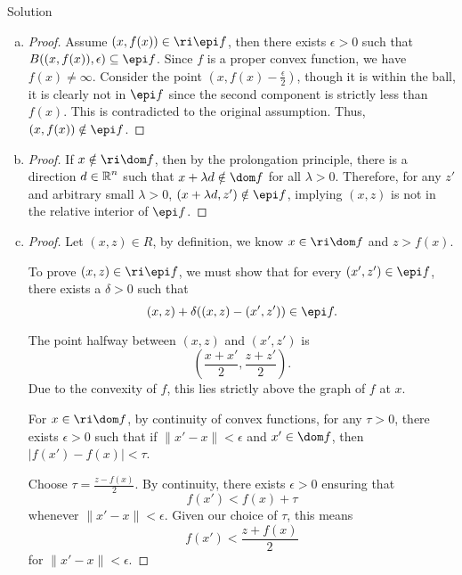 \documentclass{article}
\begin{document}
\begin{solution}
    {Solution}
    \begin{enumerate}[(a)]
        \item {
                \begin{proof}
                    Assume $(x,f(x))\in\ri\epi f$, then there exists $\epsilon>0$ such that $B((x,f(x)),\epsilon)\subseteq\epi f$. Since $f$ is a proper convex function, we have $f(x)\neq\infty$. Consider the point $(x, f(x)-\frac{\epsilon}{2})$, though it is within the ball, it is clearly not in $\epi f$ since the second component is strictly less than $f(x)$. This is contradicted to the original assumption. Thus, $(x,f(x))\notin\epi f$.
                \end{proof}
        }
        \item {
            \begin{proof}
                If $x\notin \ri\dom f$, then by the prolongation principle, there is a direction $d\in\operatorname{\mathbb{R}}^n$ such that $x+\lambda d\notin \dom f$ for all $\lambda>0$. Therefore, for any $z'$ and arbitrary small  $\lambda>0$, $(x+\lambda d, z')\notin \epi f$, implying $(x,z)$ is not in the relative interior of $\epi f$.
            \end{proof}
        }
        \item {
            \begin{proof}
                Let $(x, z) \in R$, by definition, we know $x \in \ri\dom f$ and $z > f(x)$.

                To prove $(x,z) \in \ri\epi f$, we must show that for every $(x', z') \in \epi f$, there exists a $\delta > 0$ such that
                \[(x, z) + \delta((x, z) - (x', z')) \in \epi f.\]

                The point halfway between $(x, z)$ and $(x', z')$ is
                \[ \left( \frac{x + x'}{2}, \frac{z + z'}{2} \right). \]
                Due to the convexity of $f$, this lies strictly above the graph of $f$ at $x$.

                For $x \in \ri\dom f$, by continuity of convex functions, for any $\tau > 0$, there exists $\epsilon > 0$ such that if $\|x' - x\| < \epsilon$ and $x' \in \dom f$, then $|f(x') - f(x)| < \tau$.

                Choose $\tau = \frac{z - f(x)}{2}$. By continuity, there exists $\epsilon > 0$ ensuring that
                \[ f(x') < f(x) + \tau \]
                whenever $\|x' - x\| < \epsilon$. Given our choice of $\tau$, this means
                \[ f(x') < \frac{z + f(x)}{2} \]
                for $\|x' - x\| < \epsilon$.


\end{proof}}
\end{enumerate}
\end{solution}
\end{document}
